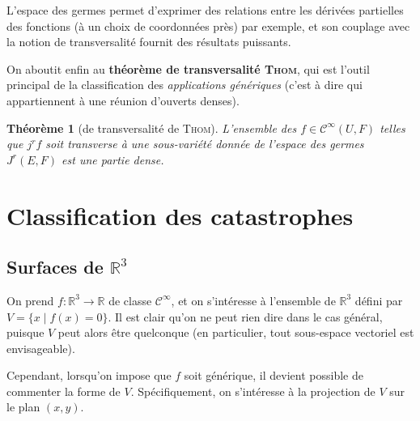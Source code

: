 \documentclass{article}
\newcommand{\cinf}{\mathcal{C}^\infty}
\newcommand{\R}{\mathbb{R}}
\newtheorem{thm}{Théorème}
\theoremstyle{definition}
\begin{document}
L'espace des germes permet d'exprimer des relations entre les dérivées partielles des fonctions (à un choix de coordonnées près) par exemple, et son couplage avec la notion de transversalité fournit des résultats puissants.

On aboutit enfin au \textbf{théorème de transversalité \textsc{Thom}}, qui est l'outil principal de la classification des \textit{applications génériques} (c'est à dire qui appartiennent à une réunion d'ouverts denses).
\begin{thm}[de transversalité de \textsc{Thom}]
	L'ensemble des $f\in\cinf(U,F)$ telles que $j^rf$ soit transverse à une sous-variété donnée de l'espace des germes $J^r(E,F)$ est une partie dense.
\end{thm}

\section{Classification des catastrophes}
\subsection{Surfaces de $\R^3$}

On prend $f: \R^3\to\R$ de classe $\cinf$, et on s'intéresse à l'ensemble de $\R^3$ défini par $V=\{x\mid f(x)=0\}$.
Il est clair qu'on ne peut rien dire dans le cas général, puisque $V$ peut alors être quelconque (en particulier, tout sous-espace vectoriel est envisageable).

Cependant, lorsqu'on impose que $f$ soit générique, il devient possible de commenter la forme de $V$.
Spécifiquement, on s'intéresse à la projection de $V$ sur le plan $(x,y)$.
\end{document}
